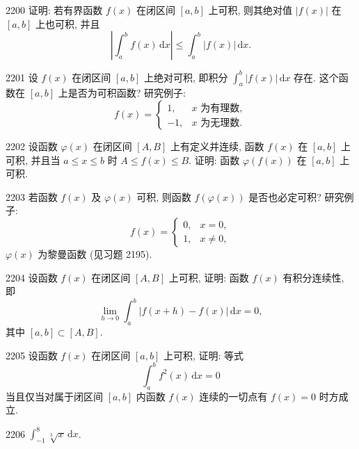 \begin{prob}[M]{2200}
证明: 若有界函数 $f(x)$ 在闭区间 $[a, b]$ 上可积, 则其绝对值 $|f(x)|$ 在 $[a, b]$ 上也可积, 并且
\[
\left|\int_{a}^{b} f(x)\,\mathrm{d}x\right| \leqslant \int_{a}^{b} |f(x)|\,\mathrm{d}x.
\]
\end{prob}

\begin{prob}[M]{2201}
设 $f(x)$ 在闭区间 $[a, b]$ 上绝对可积, 即积分 $\displaystyle\int_{a}^{b} |f(x)|\,\mathrm{d}x$ 存在. 这个函数在 $[a, b]$ 上是否为可积函数? 研究例子:
\[
f(x) = \begin{cases} 1, & x \text{ 为有理数}, \\ -1, & x \text{ 为无理数}. \end{cases}
\]
\end{prob}

\begin{prob}[M]{2202}
设函数 $\varphi(x)$ 在闭区间 $[A, B]$ 上有定义并连续, 函数 $f(x)$ 在 $[a, b]$ 上可积, 并且当 $a \leqslant x \leqslant b$ 时 $A \leqslant f(x) \leqslant B$. 证明: 函数 $\varphi(f(x))$ 在 $[a, b]$ 上可积.
\end{prob}

\begin{prob}[M]{2203}
若函数 $f(x)$ 及 $\varphi(x)$ 可积, 则函数 $f(\varphi(x))$ 是否也必定可积? 研究例子:
\[
f(x) = \begin{cases} 0, & x = 0, \\ 1, & x \neq 0, \end{cases}
\]
$\varphi(x)$ 为黎曼函数 (见习题 2195).
\end{prob}

\begin{prob}[M]{2204}
设函数 $f(x)$ 在闭区间 $[A, B]$ 上可积, 证明: 函数 $f(x)$ 有积分连续性, 即
\[
\lim_{h \to 0} \int_{a}^{b} |f(x + h) - f(x)|\,\mathrm{d}x = 0,
\]
其中 $[a, b] \subset [A, B]$.
\end{prob}

\begin{prob}[M]{2205}
设函数 $f(x)$ 在闭区间 $[a, b]$ 上可积, 证明: 等式
\[
\int_{a}^{b} f^2(x)\,\mathrm{d}x = 0
\]
当且仅当对属于闭区间 $[a, b]$ 内函数 $f(x)$ 连续的一切点有 $f(x) = 0$ 时方成立.
\end{prob}



\begin{prob}[S]{2206}
$\displaystyle\int_{-1}^{8} \sqrt[3]{x}\,\mathrm{d}x$.
\end{prob}

